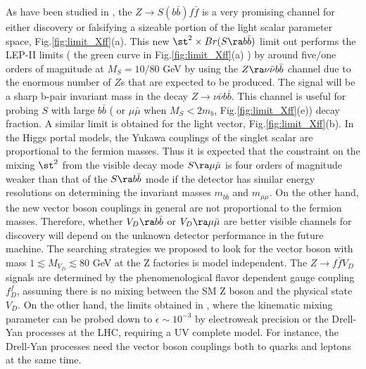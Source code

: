 \documentclass[11pt]{article}
\begin{document}
 As have been studied in \cite{Chang:2016pya,Chang:2017ynj}, the $Z\to S(b\bar{b}) f\bar{f}$ is a very promising channel for either discovery or falsifying a sizeable portion of the light scalar parameter space, Fig.\ref{fig:limit_Xff}(a).
This new  $\st^2\times Br(S\ra b\bar{b})$ limit  out performs the LEP-II limits\cite{Barate:2003sz} ( the green curve in Fig.\ref{fig:limit_Xff}(a) )  by around five/one orders of magnitude
at $M_S=10/80$ GeV by using the $Z\ra \nu\bar{\nu}b\bar{b}$ channel due to the enormous number of $Z$s that are expected to be produced.
The signal will be a sharp b-pair invariant mass in the decay $Z\to \nu\bar{\nu} b\bar{b}$.
This channel is useful for probing $S$ with large $b\bar{b}$ ( or $\mu\bar{\mu}$ when $M_S<2m_b$, Fig.\ref{fig:limit_Xff}(e)) decay fraction.
A similar limit is obtained for the light vector, Fig.\ref{fig:limit_Xff}(b).
In the Higgs portal models, the Yukawa couplings of the singlet scalar are proportional to the fermion masses.
Thus it is expected that the constraint on the mixing $\st^2$ from the visible decay mode $S\ra \mu \bar{\mu}$ is four orders of magnitude weaker than that of the $S\ra b \bar{b}$ mode if the detector has similar energy resolutions on determining the invariant masses $m_{b\bar{b}}$ and $m_{\mu\bar{\mu}}$.
On the other hand, the new vector boson couplings in general are not proportional to the fermion masses.
Therefore, whether $V_D\ra b\bar{b}$ or $V_D\ra \mu\bar{\mu}$ are better visible channels for discovery will
depend on the unknown detector performance in the future machine.
The searching strategies we proposed to look for the vector boson with mass $1\lesssim M_{V_D} \lesssim 80$ GeV at the Z factories is model independent. The $Z\to f\bar{f} V_D$
signals are determined by the phenomenological flavor dependent
gauge coupling $f_D^f$, assuming there is no mixing between the SM Z boson and the physical state $V_D$. On the other hand, the limits obtained in \cite{Hoenig:2014dsa, Curtin:2014cca}, where the kinematic mixing parameter can be probed down to $\epsilon\sim 10^{-3}$ by electroweak precision or the Drell-Yan processes at the LHC, requiring a UV complete model. For instance, the Drell-Yan processes need the vector boson couplings both to quarks and leptons at the same time.
\end{document}
